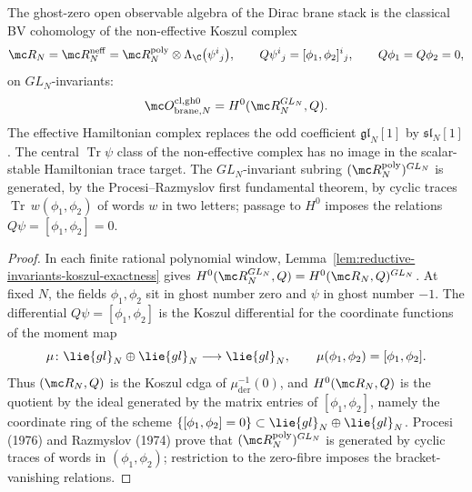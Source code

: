 \documentclass[11pt]{memoir}
\begin{document}
\begin{prop}\label{prop:open-zero-fibre-traces}
  The ghost-zero open observable algebra of the Dirac brane stack is
  the classical BV cohomology of the non-effective Koszul complex
  \[
    \mc R_N=\mc R_N^{\mathrm{neff}}
      =\mc R^{\mathrm{poly}}_N\otimes
      \Lambda_{\C}\bigl(\psi^i{}_j\bigr),\qquad
    Q\psi^i{}_j=[\phi_1,\phi_2]^i{}_j,\qquad
    Q\phi_1=Q\phi_2=0,
  \]
  on \(GL_N\)-invariants:
  \[
    \mc O^{\mathrm{cl,gh0}}_{\mathrm{brane},N}
      =H^0(\mc R_N^{GL_N},Q).
	  \]
  The effective Hamiltonian complex replaces the odd coefficient
  \(\mathfrak{gl}_N[1]\) by \(\mathfrak{sl}_N[1]\).  The central
  \(\operatorname{Tr}\psi\) class of the non-effective complex has no
  image in the scalar-stable Hamiltonian trace target.
  The \(GL_N\)-invariant subring \((\mc R^{\mathrm{poly}}_N)^{GL_N}\)
  is generated, by the Procesi--Razmyslov first fundamental theorem,
  by cyclic traces \(\operatorname{Tr}\,w(\phi_1,\phi_2)\) of words
  \(w\) in two letters; passage to \(H^0\) imposes the relations
  \(Q\psi=[\phi_1,\phi_2]=0\).
\end{prop}

\begin{proof}
  In each finite rational polynomial window,
  Lemma~\ref{lem:reductive-invariants-koszul-exactness} gives
  \(H^0(\mc R_N^{GL_N},Q)=H^0(\mc R_N,Q)^{GL_N}\).  At fixed \(N\), the fields
  \(\phi_1,\phi_2\) sit in ghost number zero and \(\psi\) in ghost
  number \(-1\).  The differential \(Q\psi=[\phi_1,\phi_2]\) is the
  Koszul differential for the coordinate functions of the moment map
  \[
    \mu\colon\lie{gl}_N\oplus\lie{gl}_N\longrightarrow\lie{gl}_N,
    \qquad
    \mu(\phi_1,\phi_2)=[\phi_1,\phi_2].
  \]
  Thus \((\mc R_N,Q)\) is the Koszul cdga of
  \(\mu^{-1}_{\mathrm{der}}(0)\), and \(H^0(\mc R_N,Q)\) is the
  quotient by the ideal generated by the matrix entries of
  \([\phi_1,\phi_2]\), namely the coordinate ring of the scheme
  \(\{[\phi_1,\phi_2]=0\}\subset\lie{gl}_N\oplus\lie{gl}_N\). Procesi
  (1976) and Razmyslov (1974) prove that
  \((\mc R^{\mathrm{poly}}_N)^{GL_N}\) is generated by cyclic traces
  of words in \((\phi_1,\phi_2)\); restriction to the zero-fibre
  imposes the bracket-vanishing relations.
\end{proof}
\end{document}
